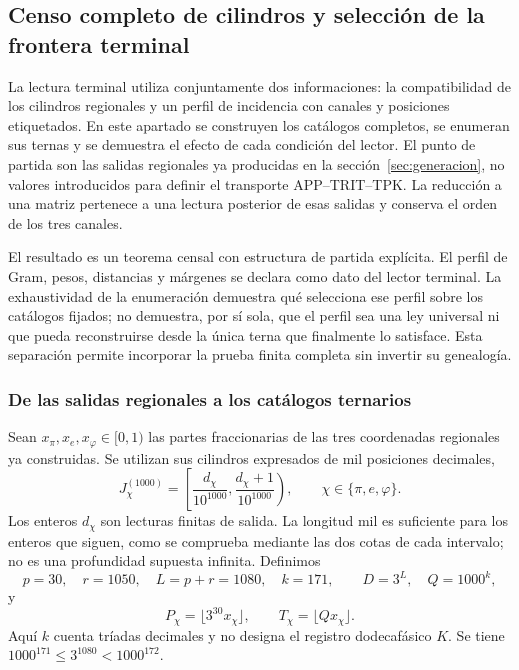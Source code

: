 \subsection{Censo completo de cilindros y selección de la frontera terminal}
\label{act21:censo:terminal-completo}

La lectura terminal utiliza conjuntamente dos informaciones: la compatibilidad
de los cilindros regionales y un perfil de incidencia con canales y posiciones
etiquetados. En este apartado se construyen los catálogos completos, se
enumeran sus ternas y se demuestra el efecto de cada condición del lector.
El punto de partida son las salidas regionales ya producidas en la
sección~\ref{sec:generacion}, no valores introducidos para definir el
transporte APP--TRIT--TPK. La reducción a una matriz pertenece a una lectura
posterior de esas salidas y conserva el orden de los tres canales.

El resultado es un teorema censal con estructura de partida explícita.
El perfil de Gram, pesos, distancias y márgenes se declara como dato del
lector terminal. La exhaustividad de la enumeración demuestra qué selecciona
ese perfil sobre los catálogos fijados; no demuestra, por sí sola, que el
perfil sea una ley universal ni que pueda reconstruirse desde la única terna
que finalmente lo satisface. Esta separación permite incorporar la prueba
finita completa sin invertir su genealogía.

\subsubsection{De las salidas regionales a los catálogos ternarios}

Sean \(x_\pi,x_e,x_\varphi\in[0,1)\) las partes fraccionarias de las
tres coordenadas regionales ya construidas. Se utilizan sus cilindros
expresados de mil posiciones decimales,
\[
 J_\chi^{(1000)}=
 \left[\frac{d_\chi}{10^{1000}},
       \frac{d_\chi+1}{10^{1000}}\right),
 \qquad \chi\in\{\pi,e,\varphi\}.
\]
Los enteros \(d_\chi\) son lecturas finitas de salida. La longitud mil
es suficiente para los enteros que siguen, como se comprueba mediante las
dos cotas de cada intervalo; no es una profundidad supuesta infinita.
Definimos
\begin{equation}
 p=30,\quad r=1050,\quad L=p+r=1080,\quad k=171,
 \qquad D=3^L,\quad Q=1000^k,
 \label{act21:censo:parametros}
\end{equation}
y
\[
 P_\chi=\lfloor3^{30}x_\chi\rfloor,\qquad
 T_\chi=\lfloor Qx_\chi\rfloor.
\]
Aquí \(k\) cuenta tríadas decimales y no designa el registro dodecafásico
\(K\). Se tiene \(1000^{171}\leq3^{1080}<1000^{172}\).

